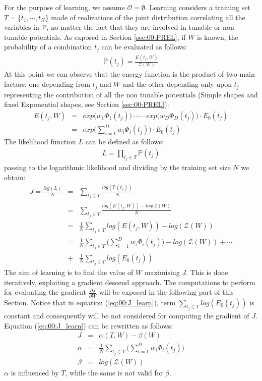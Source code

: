 For the purpose of learning, we assume $\mathcal{O} = \emptyset$. Learning considers a training set $T = \lbrace t_1, \cdots ,t_N \rbrace$ made of realizations of the joint distribution correlating all the variables in $\mathcal{V}$, no matter the fact that they are involved in tunable or non tunable potentials.
As exposed in Section \ref{sec:00:PREL}, if $W$ is known, the probability of a combination $t_j$ can be evaluated as follows:
\begin{eqnarray}
\mathbb{P}(t_j) = \frac{E(t_j, W)}{\mathcal{Z}(W)}
\end{eqnarray}
At this point we can observe that the energy function is the product of two main factors: one depending from $t_j$ and $W$  and the other depending only upon $t_j$ representing the contribution of all the non tunable potentials (Simple shapes and fixed Exponential shapes, see Section \ref{sec:00:PREL}):
\begin{eqnarray}
E(t_j, W) &=&  exp \big( w_1 \Phi _1(t_j) \big) \cdot \cdots \cdot exp \big( w_D \Phi _D(t_j) \big) \cdot E_0(t_j) \nonumber\\
		  &=& exp \big( \sum _{i=1} ^{D} w_i \Phi _i(t_j) \big) \cdot E_0(t_j)
\end{eqnarray}
The likelihood function $L$ can be defined as follows:
\begin{eqnarray}
L = \prod _{t_j \in T} \mathbb{P}(t_j) 
\end{eqnarray}
passing to the logarithmic likelihood and dividing by the training set size $N$ we obtain:
\begin{eqnarray}
J = \frac{log(L)}{N} &=& \sum _{t_j \in T} \frac{log(\mathbb{P}(t_j))}{N} \nonumber\\
   					 &=& \sum _{t_j \in T} \frac{ log(E(t_j, W)) - log(\mathcal{Z}(W) }{N} \nonumber\\
   					 &=& \frac{1}{N} \sum _{t_j \in T}  log(E(t_j, W)) - log(\mathcal{Z}(W)) \nonumber\\
   					 &=& \frac{1}{N} \sum _{t_j \in T}  \big( \sum _{i=1} ^{D} w_i \Phi _i(t_j) \big)
   					     -log(\mathcal{Z}(W)) + \cdots \nonumber\\
   					 	 &+& \frac{1}{N} \sum _{t_j \in T}  log(E_0 (t_j))
   					 	 \label{eq:00:J_learn}
\end{eqnarray}
The aim of learning is to find the value of $W$ maximising $J$. This is done iteratively, exploiting a gradient descend approach. The computations to perform for evaluating the gradient $\frac{\partial J}{\partial W}$ will be exposed in the following part of this Section.
Notice that in equation (\ref{eq:00:J_learn}), term $\sum _{t_j \in T}  log(E_0 (t_j))$ is constant and consequently will be not considered for computing the gradient of $J$. Equation (\ref{eq:00:J_learn}) can be rewritten as follows:
\begin{eqnarray}
J &=& \alpha (T, W) - \beta (W) \nonumber\\
\alpha &=& \frac{1}{N} \sum _{t_j \in T}  \big( \sum _{i=1} ^{D} w_i \Phi _i(t_j) \big) \label{eq:00:J_learn_alfa} \\
\beta &=& log(\mathcal{Z}(W)) \label{eq:00:J_learn_beta}
\end{eqnarray}
$\alpha$ is influenced by $T$, while the same is not valid for $\beta$. 

